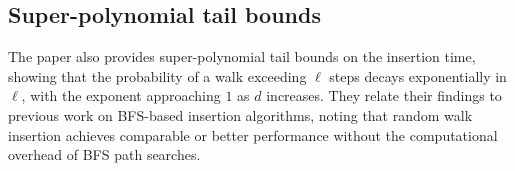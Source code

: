 \subsection{Super-polynomial tail bounds}
The paper also provides super-polynomial tail bounds on the insertion time, showing that the probability of a walk exceeding $\ell$ steps decays exponentially in $\ell$, with the exponent approaching $1$ as $d$ increases. They relate their findings to previous work on BFS-based insertion algorithms, noting that random walk insertion achieves comparable or better performance without the computational overhead of BFS path searches.